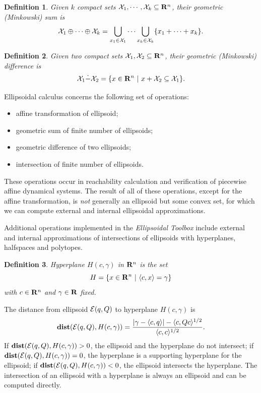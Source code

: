 \documentclass{report}
\newtheorem{df}{Definition}[section]
\newcommand{\bd}{\begin{df}}
\newcommand{\ed}{\end{df}}
\newcommand{\EE}{{\cal E}}
\newcommand{\XX}{{\cal X}}
\begin{document}
\bd
Given $k$ compact sets $\XX_1, \cdots, \XX_k\subseteq{\bf R}^n$,
their geometric (Minkowski) sum is
\begin{equation}
\XX_1\oplus\cdots\oplus\XX_k=\bigcup_{x_1\in\XX_1}\cdots\bigcup_{x_k\in\XX_k}
\{x_1 + \cdots + x_k\} .  \label{minksum}
\end{equation}
\ed
\bd
Given two compact sets $\XX_1, \XX_2 \subseteq{\bf R}^n$, their geometric
(Minkowski) difference is
\begin{equation}
\XX_1\dot{-}\XX_2 = \{x\in{\bf R}^n ~|~ x + \XX_2 \subseteq \XX_1 \}.
\label{minkdiff}
\end{equation}
\ed
Ellipsoidal calculus concerns the following set of operations:
\begin{itemize}
\item affine transformation of ellipsoid;
\item geometric sum of finite number of ellipsoids;
\item geometric difference of two ellipsoids;
\item intersection of finite number of ellipsoids.
\end{itemize}
These operations occur in reachability calculation and verification
of piecewise affine dynamical systems. The result of all of these operations,
except for the affine transformation, is \emph{not} generally an ellipsoid
but some convex set, for which we can compute external and internal ellipsoidal
approximations.

Additional operations implemented in the {\it Ellipsoidal Toolbox} include
external and internal approximations of intersections of ellipsoids with
hyperplanes, halfspaces and polytopes.
\bd
Hyperplane $H(c,\gamma)$ in ${\bf R}^n$ is the set
\begin{equation}
H = \{x\in{\bf R}^n ~|~ \langle c, x\rangle = \gamma\}
\label{hyperplane}
\end{equation}
with $c\in{\bf R}^n$ and $\gamma\in{\bf R}$ fixed.
\label{hyperplanedef}
\ed
The distance from ellipsoid $\EE(q,Q)$ to hyperplane $H(c,\gamma)$ is
\begin{equation}
{\bf dist}(\EE(q,Q),H(c,\gamma)) =
\frac{\left|\gamma-\langle c,q\rangle\right| -
\langle c,Qc\rangle^{1/2}}{\langle c,c\rangle^{1/2}}. \label{dist_hp}
\end{equation}
If ${\bf dist}(\EE(q,Q),H(c,\gamma))>0$, the ellipsoid and the hyperplane
do not intersect;
if ${\bf dist}(\EE(q,Q),H(c,\gamma))=0$, the hyperplane is a supporting
hyperplane for the ellipsoid;
if ${\bf dist}(\EE(q,Q),H(c,\gamma))<0$, the ellipsoid intersects the
hyperplane.
The intersection of an ellipsoid with a hyperplane is always an ellipsoid
and can be computed directly.
\end{document}
